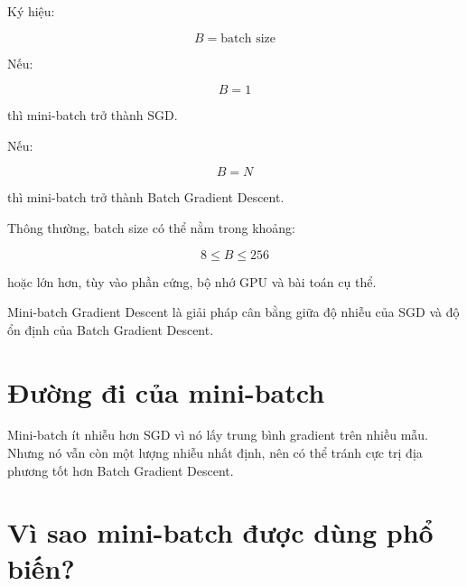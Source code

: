 \documentclass[12pt,a4paper]{report}
\begin{document}
Ký hiệu:

\[
    B = \text{batch size}
\]

Nếu:

\[
    B=1
\]

thì mini-batch trở thành SGD.

Nếu:

\[
    B=N
\]

thì mini-batch trở thành Batch Gradient Descent.

Thông thường, batch size có thể nằm trong khoảng:

\[
    8 \leq B \leq 256
\]

hoặc lớn hơn, tùy vào phần cứng, bộ nhớ GPU và bài toán cụ thể.

\begin{ghinho}
Mini-batch Gradient Descent là giải pháp cân bằng giữa độ nhiễu của SGD và độ ổn định của Batch Gradient Descent.
\end{ghinho}

\section{Đường đi của mini-batch}

Mini-batch ít nhiễu hơn SGD vì nó lấy trung bình gradient trên nhiều mẫu. Nhưng nó vẫn còn một lượng nhiễu nhất định, nên có thể tránh cực trị địa phương tốt hơn Batch Gradient Descent.

\begin{center}
\end{center}

\section{Vì sao mini-batch được dùng phổ biến?}
\end{document}
